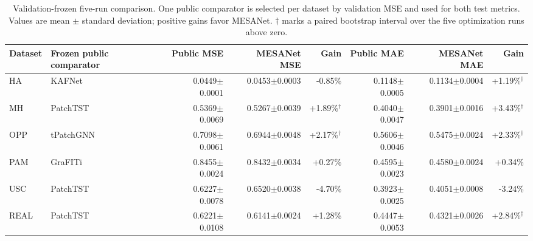 \begin{table}[t]
\centering
\setlength{\tabcolsep}{2.2pt}
\caption{Validation-frozen five-run comparison. One public comparator is
selected per dataset by validation MSE and used for both test metrics. Values
are mean $\pm$ standard deviation; positive gains favor MESANet. $\dagger$
marks a paired bootstrap interval over the five optimization runs above zero.}
\label{tab:v671-validation-frozen}
\begin{tabular}{@{}llrrrrrr@{}}
\toprule
Dataset & Frozen public comparator & Public MSE & MESANet MSE & Gain & Public MAE & MESANet MAE & Gain \\
\midrule
HA & KAFNet & 0.0449$\pm$0.0001 & 0.0453$\pm$0.0003 & -0.85\% & 0.1148$\pm$0.0005 & 0.1134$\pm$0.0004 & +1.19\%$^\dagger$ \\
MH & PatchTST & 0.5369$\pm$0.0069 & 0.5267$\pm$0.0039 & +1.89\%$^\dagger$ & 0.4040$\pm$0.0047 & 0.3901$\pm$0.0016 & +3.43\%$^\dagger$ \\
OPP & tPatchGNN & 0.7098$\pm$0.0061 & 0.6944$\pm$0.0048 & +2.17\%$^\dagger$ & 0.5606$\pm$0.0046 & 0.5475$\pm$0.0024 & +2.33\%$^\dagger$ \\
PAM & GraFITi & 0.8455$\pm$0.0024 & 0.8432$\pm$0.0034 & +0.27\% & 0.4595$\pm$0.0023 & 0.4580$\pm$0.0024 & +0.34\% \\
USC & PatchTST & 0.6227$\pm$0.0078 & 0.6520$\pm$0.0038 & -4.70\% & 0.3923$\pm$0.0025 & 0.4051$\pm$0.0008 & -3.24\% \\
REAL & PatchTST & 0.6221$\pm$0.0108 & 0.6141$\pm$0.0024 & +1.28\% & 0.4447$\pm$0.0053 & 0.4321$\pm$0.0026 & +2.84\%$^\dagger$ \\
\bottomrule
\end{tabular}
\end{table}
